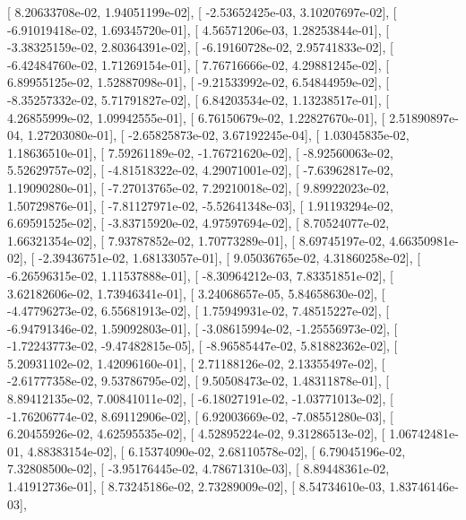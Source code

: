 \documentclass{article}
\begin{document}
       [  8.20633708e-02,   1.94051199e-02],
       [ -2.53652425e-03,   3.10207697e-02],
       [ -6.91019418e-02,   1.69345720e-01],
       [  4.56571206e-03,   1.28253844e-01],
       [ -3.38325159e-02,   2.80364391e-02],
       [ -6.19160728e-02,   2.95741833e-02],
       [ -6.42484760e-02,   1.71269154e-01],
       [  7.76716666e-02,   4.29881245e-02],
       [  6.89955125e-02,   1.52887098e-01],
       [ -9.21533992e-02,   6.54844959e-02],
       [ -8.35257332e-02,   5.71791827e-02],
       [  6.84203534e-02,   1.13238517e-01],
       [  4.26855999e-02,   1.09942555e-01],
       [  6.76150679e-02,   1.22827670e-01],
       [  2.51890897e-04,   1.27203080e-01],
       [ -2.65825873e-02,   3.67192245e-04],
       [  1.03045835e-02,   1.18636510e-01],
       [  7.59261189e-02,  -1.76721620e-02],
       [ -8.92560063e-02,   5.52629757e-02],
       [ -4.81518322e-02,   4.29071001e-02],
       [ -7.63962817e-02,   1.19090280e-01],
       [ -7.27013765e-02,   7.29210018e-02],
       [  9.89922023e-02,   1.50729876e-01],
       [ -7.81127971e-02,  -5.52641348e-03],
       [  1.91193294e-02,   6.69591525e-02],
       [ -3.83715920e-02,   4.97597694e-02],
       [  8.70524077e-02,   1.66321354e-02],
       [  7.93787852e-02,   1.70773289e-01],
       [  8.69745197e-02,   4.66350981e-02],
       [ -2.39436751e-02,   1.68133057e-01],
       [  9.05036765e-02,   4.31860258e-02],
       [ -6.26596315e-02,   1.11537888e-01],
       [ -8.30964212e-03,   7.83351851e-02],
       [  3.62182606e-02,   1.73946341e-01],
       [  3.24068657e-05,   5.84658630e-02],
       [ -4.47796273e-02,   6.55681913e-02],
       [  1.75949931e-02,   7.48515227e-02],
       [ -6.94791346e-02,   1.59092803e-01],
       [ -3.08615994e-02,  -1.25556973e-02],
       [ -1.72243773e-02,  -9.47482815e-05],
       [ -8.96585447e-02,   5.81882362e-02],
       [  5.20931102e-02,   1.42096160e-01],
       [  2.71188126e-02,   2.13355497e-02],
       [ -2.61777358e-02,   9.53786795e-02],
       [  9.50508473e-02,   1.48311878e-01],
       [  8.89412135e-02,   7.00841011e-02],
       [ -6.18027191e-02,  -1.03771013e-02],
       [ -1.76206774e-02,   8.69112906e-02],
       [  6.92003669e-02,  -7.08551280e-03],
       [  6.20455926e-02,   4.62595535e-02],
       [  4.52895224e-02,   9.31286513e-02],
       [  1.06742481e-01,   4.88383154e-02],
       [  6.15374090e-02,   2.68110578e-02],
       [  6.79045196e-02,   7.32808500e-02],
       [ -3.95176445e-02,   4.78671310e-03],
       [  8.89448361e-02,   1.41912736e-01],
       [  8.73245186e-02,   2.73289009e-02],
       [  8.54734610e-03,   1.83746146e-03],
\end{document}
